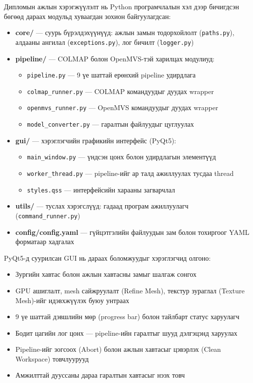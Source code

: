 Дипломын ажлын хэрэгжүүлэлт нь Python програмчлалын хэл дээр бичигдсэн бөгөөд дараах модульд хуваагдан зохион байгуулагдсан:

\begin{itemize}
    \item \textbf{core/} — суурь бүрэлдэхүүнүүд: ажлын замын тодорхойлолт (\texttt{paths.py}), алдааны ангилал (\texttt{exceptions.py}), лог бичилт (\texttt{logger.py})
    \item \textbf{pipeline/} — COLMAP болон OpenMVS-тэй харилцах модулиуд:
    \begin{itemize}
        \item \texttt{pipeline.py} — 9 үе шаттай ерөнхий pipeline удирдлага
        \item \texttt{colmap\_runner.py} — COLMAP командуудыг дуудах wrapper
        \item \texttt{openmvs\_runner.py} — OpenMVS командуудыг дуудах wrapper
        \item \texttt{model\_converter.py} — гаралтын файлуудыг цуглуулах
    \end{itemize}
    \item \textbf{gui/} — хэрэглэгчийн графикийн интерфейс (PyQt5):
    \begin{itemize}
        \item \texttt{main\_window.py} — үндсэн цонх болон удирдлагын элементүүд
        \item \texttt{worker\_thread.py} — pipeline-ийг ар талд ажиллуулах тусдаа thread
        \item \texttt{styles.qss} — интерфейсийн харааны загварчлал
    \end{itemize}
    \item \textbf{utils/} — туслах хэрэгслүүд: гадаад програм ажиллуулагч (\texttt{command\_runner.py})
    \item \textbf{config/config.yaml} — гүйцэтгэлийн файлуудын зам болон тохиргоог YAML форматаар хадгалах
\end{itemize}

PyQt5-д суурилсан GUI нь дараах боломжуудыг хэрэглэгчид олгоно:

\begin{itemize}
    \item Зургийн хавтас болон ажлын хавтасны замыг шалгаж сонгох
    \item GPU ашиглалт, mesh сайжруулалт (Refine Mesh), текстур зураглал (Texture Mesh)-ийг идэвхжүүлэх буюу унтраах
    \item 9 үе шаттай дэвшлийн мөр (progress bar) болон тайлбарт статус харуулагч
    \item Бодит цагийн лог цонх — pipeline-ийн гаралтыг шууд дэлгэцэнд харуулах
    \item Pipeline-ийг зогсоох (Abort) болон ажлын хавтасыг цэвэрлэх (Clean Workspace) товчлуурууд
    \item Амжилттай дууссаны дараа гаралтын хавтасыг нээх товч
\end{itemize}

